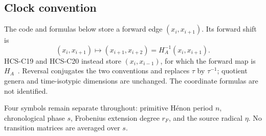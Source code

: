 \subsection{Clock convention}

The code and formulas below store a forward edge $(x_i,x_{i+1})$.  Its
forward shift is
\begin{equation}\label{eq:edge-shift}
 (x_i,x_{i+1})\longmapsto(x_{i+1},x_{i+2})
 =H_A^{-1}(x_i,x_{i+1}).
\end{equation}
HCS-C19 and HCS-C20 instead store $(x_i,x_{i-1})$, for which the forward map
is $H_A$~\cite[Sec.~3, Cor.~3]{hcsc19}\cite[Sec.~1]{hcsc20}.  Reversal
conjugates the two conventions and
replaces $\tau$ by $\tau^{-1}$; quotient genera and time-isotypic dimensions
are unchanged.  The coordinate formulas are not identified.

Four symbols remain separate throughout: primitive H\'enon period $n$,
chronological phase $s$, Frobenius extension degree $r_F$, and the source
radical $\eta$.  No transition matrices are averaged over $s$.
